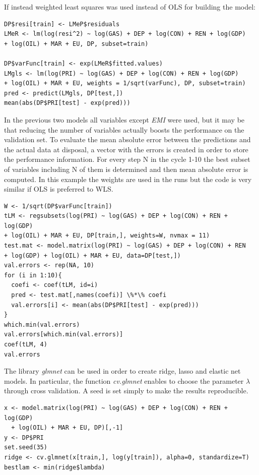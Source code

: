 \documentclass[a4paper,12pt]{book}
\begin{document}
If instead weighted least squares was used instead of OLS for building the model:

\begin{verbatim}
DP$resi[train] <- LMeP$residuals
LMeR <- lm(log(resi^2) ~ log(GAS) + DEP + log(CON) + REN + log(GDP)
+ log(OIL) + MAR + EU, DP, subset=train)

DP$varFunc[train] <- exp(LMeR$fitted.values)
LMgls <- lm(log(PRI) ~ log(GAS) + DEP + log(CON) + REN + log(GDP)
+ log(OIL) + MAR + EU, weights = 1/sqrt(varFunc), DP, subset=train)
pred <- predict(LMgls, DP[test,])
mean(abs(DP$PRI[test] - exp(pred)))
\end{verbatim}

In the previous two models all variables except \textit{EMI} were used, but it may be that reducing the number of variables actually boosts the performance on the validation set. To evaluate the mean absolute error between the predictions and the actual data at disposal, a vector with the errors is created in order to store the performance information. For every step N in the cycle 1-10 the best subset of variables including N of them is determined and then mean absolute error is computed. In this example the weights are used in the runs but the code is very similar if OLS is preferred to WLS.

\begin{verbatim}
W <- 1/sqrt(DP$varFunc[train])
tLM <- regsubsets(log(PRI) ~ log(GAS) + DEP + log(CON) + REN + log(GDP)
+ log(OIL) + MAR + EU, DP[train,], weights=W, nvmax = 11)
test.mat <- model.matrix(log(PRI) ~ log(GAS) + DEP + log(CON) + REN
+ log(GDP) + log(OIL) + MAR + EU, data=DP[test,])
val.errors <- rep(NA, 10)
for (i in 1:10){
  coefi <- coef(tLM, id=i)
  pred <- test.mat[,names(coefi)] \%*\% coefi
  val.errors[i] <- mean(abs(DP$PRI[test] - exp(pred)))
}
which.min(val.errors)
val.errors[which.min(val.errors)]
coef(tLM, 4)
val.errors
\end{verbatim}

The library \textit{glmnet} can be used in order to create ridge, lasso and elastic net models. In particular, the function \textit{cv.glmnet} enables to choose the parameter $\lambda$ through cross validation. A seed is set simply to make the results reproducible.

\begin{verbatim}
x <- model.matrix(log(PRI) ~ log(GAS) + DEP + log(CON) + REN + log(GDP)
  + log(OIL) + MAR + EU, DP)[,-1]
y <- DP$PRI
set.seed(35)
ridge <- cv.glmnet(x[train,], log(y[train]), alpha=0, standardize=T)
bestlam <- min(ridge$lambda)
\end{verbatim}
\end{document}
